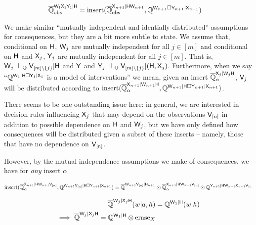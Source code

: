 \begin{align}
    \overline{\mathbb{Q}}_{\text{obs}}^{\mathsf{W_1X_1Y_1}|\mathsf{H}} &= \text{insert}(\overline{\mathbb{Q}}_{\text{obs}}^{\mathsf{X}_{n+1}|\mathsf{HW}_{n+1}},\mathbb{Q}^{\mathsf{W}_{n+1}\square\mathsf{Y}_{n+1}|\mathsf{X}_{n+1}})
\end{align}

We make similar ``mutually independent and identially distributed'' assumptions for consequences, but they are a bit more subtle to state. We assume that, conditional on $\mathsf{H}$, $\mathsf{W}_j$ are mutually independent for all $j\in [m]$ and conditional on $\mathsf{H}$ and $\mathsf{X}_j$, $\mathsf{Y}_j$ are mutually independent for all $j\in [m]$. That is, $\RV{W}_j\CI_{\model{Q}} \RV{V}_{[m]\setminus \{j\}}|\RV{H}$ and $\mathsf{Y}$ and $\RV{Y}_j\CI_{\model{Q}} \RV{V}_{[m]\setminus\{j\}}|(\RV{H},\RV{X}_j)$. Furthermore, when we say ``$\mathbb{Q}^{\mathsf{W}_1|\mathsf{H}\square\mathsf{Y}_1|\mathsf{X}_1}$ is a model of interventions'' we mean, given an insert $\overline{\mathbb{Q}}_{\alpha}^{\mathsf{X}_j|\mathsf{W}_j\mathsf{H}}$, $\mathsf{V}_j$ will be distributed according to $\text{insert}(\overline{\mathbb{Q}}_{\alpha}^{\mathsf{X}_{n+1}|\mathsf{W}_{n+1}\mathsf{H}},\mathbb{Q}^{\mathsf{W}_{n+1}|\mathsf{H}\square\mathsf{Y}_{n+1}|\mathsf{X}_{n+1}})$.

There seems to be one outstanding issue here: in general, we are interested in decision rules influencing $\mathsf{X}_j$ that may depend on the observations $\mathsf{V}_{[n]}$ in addition to possible dependence on $\mathsf{H}$ and $\mathsf{W}_j$, but we have only defined how consequences will be distributed given a subset of these inserts -- namely, those that have no dependence on $\mathsf{V}_{[n]}$. 

However, by the mutual independence assumptions we make of consequences, we have for \emph{any} insert $\alpha$

\begin{align}
    \text{insert}(\overline{\mathbb{Q}}_{\alpha}^{\mathsf{X}_{n+1}|\mathsf{HW}_{n+1}\mathsf{V}_{[n]}},\mathbb{Q}^{\mathsf{W}_{n+1}\mathsf{V}_{[n]}|\mathsf{H}\square\mathsf{Y}_{n+1}|\mathsf{X}_{n+1}}) &= \overline{\mathbb{Q}}^{\mathsf{W}_{n+1}\mathsf{V}_{[n]}|\mathsf{H}_{n+1}}\odot \overline{\mathbb{Q}}_{\alpha}^{\mathsf{X}_{n+1}|\mathsf{HW}_{n+1}\mathsf{V}_{[n]}}\odot \mathbb{Q}^{\mathsf{Y}_{n+1}|\mathsf{HW}_{n+1}\mathsf{X}_{n+1}\mathsf{V}_{[n}}\\
\end{align}

\begin{align}
    \overline{\mathbb{Q}}^{\mathsf{W}_j|\mathsf{X}_j\mathsf{H}}(w|a,h) &= \mathbb{Q}^{\mathsf{W}_1|\mathsf{H}}(w|h)\\
    \implies \overline{\mathbb{Q}}^{\mathsf{W}_j|\mathsf{X}_j\mathsf{H}} = \mathbb{Q}^{\mathsf{W}_1|\mathsf{H}}\otimes \text{erase}_{X}
\end{align}

